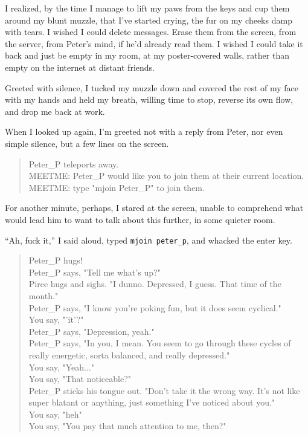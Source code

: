 I realized, by the time I manage to lift my paws from the keys and cup them around my blunt muzzle, that I've started crying, the fur on my cheeks damp with tears. I wished I could delete messages. Erase them from the screen, from the server, from Peter's mind, if he'd already read them. I wished I could take it back and just be empty in my room, at my poster-covered walls, rather than empty on the internet at distant friends.

Greeted with silence, I tucked my muzzle down and covered the rest of my face with my hands and held my breath, willing time to stop, reverse its own flow, and drop me back at work.

When I looked up again, I'm greeted not with a reply from Peter, nor even simple silence, but a few lines on the screen.

\begin{verse}
    {\ttfamily
Peter\_P teleports away.\\
MEETME: Peter\_P would like you to join them at their current location.\\
MEETME: type "mjoin Peter\_P" to join them.}
\end{verse}

For another minute, perhaps, I stared at the screen, unable to comprehend what would lead him to want to talk about this further, in some quieter room.

``Ah, fuck it,'' I said aloud, typed \texttt{mjoin\ peter\_p}, and whacked the enter key.

\begin{verse}
    {\ttfamily
Peter\_P hugs!\\
Peter\_P says, "Tell me what's up?"\\
Piree hugs and sighs. "I dunno. Depressed, I guess. That time of the month."\\
Peter\_P says, "I know you're poking fun, but it does seem cyclical."\\
You say, "'it'?"\\
Peter\_P says, "Depression, yeah."\\
Peter\_P says, "In you, I mean. You seem to go through these cycles of really energetic, sorta balanced, and really depressed."\\
You say, "Yeah..."\\
You say, "That noticeable?"\\
Peter\_P sticks his tongue out. "Don't take it the wrong way. It's not like super blatant or anything, just something I've noticed about you."\\
You say, "heh"\\
You say, "You pay that much attention to me, then?"}
\end{verse}

